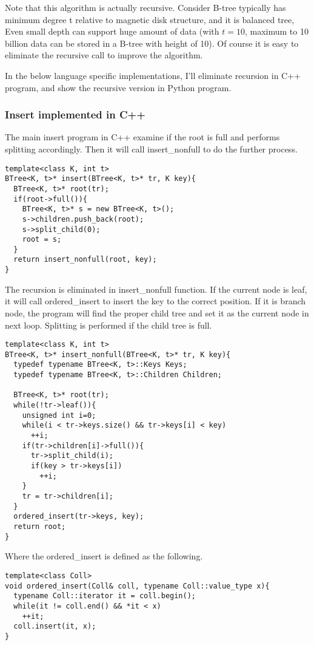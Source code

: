 \documentclass{article}
\begin{document}
Note that this algorithm is actually recursive. Consider B-tree typically
has minimum degree t relative to magnetic disk structure, and it is balanced 
tree, Even small depth can support huge amount of data 
(with $t=10$, maximum to 10 billion data can be stored in a B-tree with height of 10).
Of course it is easy to eliminate the recursive call to improve the algorithm.

In the below language specific implementations, I'll eliminate recursion in 
C++ program, and show the recursive version in Python program.

\subsubsection*{Insert implemented in C++}
The main insert program in C++ examine if the root is full and performs splitting
accordingly. Then it will call insert\_nonfull to do the further process.

\lstset{language=C++}
\begin{lstlisting}
template<class K, int t>
BTree<K, t>* insert(BTree<K, t>* tr, K key){
  BTree<K, t>* root(tr);
  if(root->full()){
    BTree<K, t>* s = new BTree<K, t>();
    s->children.push_back(root);
    s->split_child(0);
    root = s;
  }
  return insert_nonfull(root, key);
}
\end{lstlisting}

The recursion is eliminated in insert\_nonfull function. If the current
node is leaf, it will call ordered\_insert to insert the key to the correct
position. If it is branch node, the program will find the proper child
tree and set it as the current node in next loop. Splitting is performed
if the child tree is full.

\begin{lstlisting}
template<class K, int t>
BTree<K, t>* insert_nonfull(BTree<K, t>* tr, K key){
  typedef typename BTree<K, t>::Keys Keys;
  typedef typename BTree<K, t>::Children Children;

  BTree<K, t>* root(tr);
  while(!tr->leaf()){
    unsigned int i=0;
    while(i < tr->keys.size() && tr->keys[i] < key)
      ++i;
    if(tr->children[i]->full()){
      tr->split_child(i);
      if(key > tr->keys[i])
        ++i;
    }
    tr = tr->children[i];
  }
  ordered_insert(tr->keys, key);
  return root;
}
\end{lstlisting}

Where the ordered\_insert is defined as the following.

\begin{lstlisting}
template<class Coll>
void ordered_insert(Coll& coll, typename Coll::value_type x){
  typename Coll::iterator it = coll.begin();
  while(it != coll.end() && *it < x)
    ++it;
  coll.insert(it, x);
}
\end{lstlisting}
\end{document}
